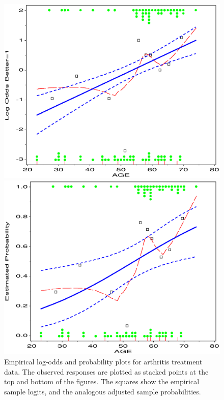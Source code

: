 \begin{figure}[htb]
 \begin{minipage}[t]{.49\linewidth}
  \includegraphics[width=1\linewidth]{ch6/fig/logoddt1}
 \end{minipage}%
 \hfill
 \begin{minipage}[t]{.49\linewidth}
  \includegraphics[width=1\linewidth]{ch6/fig/logoddt2}
 \end{minipage}
 \caption[Empirical log-odds and probability plots for arthritis treatment data]{Empirical log-odds and probability plots for arthritis treatment data.
 The observed responses are plotted as stacked points at the top and bottom of the figures.  The squares show the empirical sample logits, and the analogous adjusted sample probabilities.}\label{fig:logoddt}
\end{figure}

